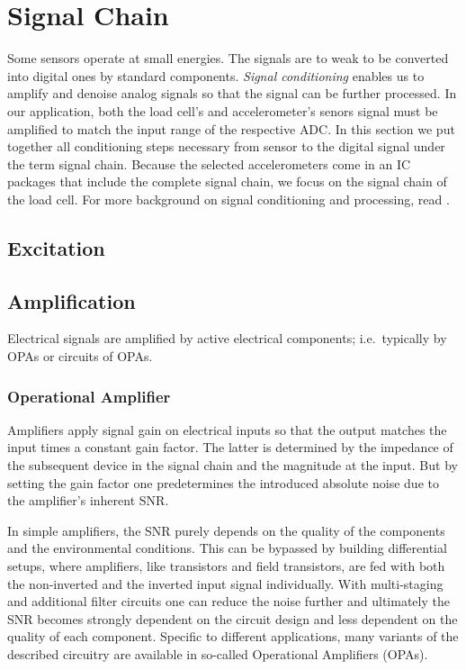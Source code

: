 \chapter{Signal Chain%
  \label{chap:\currfilebase}}

Some sensors operate at small energies. The signals are to weak to be converted into digital ones by standard components. \emph{Signal conditioning} enables us to amplify and denoise analog signals so that the signal can be further processed. In our application, both the load cell's and accelerometer's senors signal must be amplified to match the input range of the respective \ac{ADC}. In this section we put together all conditioning steps necessary from sensor to the digital signal under the term signal chain. Because the selected accelerometers come in an \ac{IC} packages that include the complete signal chain, we focus on the signal chain of the load cell. For more background on signal conditioning and processing, read .

\section{Excitation}

\section{Amplification}
Electrical signals are amplified by active electrical components; i.e.\ typically by \ac{OPA}s or circuits of \ac{OPA}s.

\subsection{Operational Amplifier}

Amplifiers apply signal gain on electrical inputs so that the output matches the input times a constant gain factor. The latter is determined by the impedance of the subsequent device in the signal chain and the magnitude at the input. But by setting the gain factor one predetermines the introduced absolute noise due to the amplifier's inherent \ac{SNR}.

In simple amplifiers, the \ac{SNR} purely depends on the quality of the components and the environmental conditions. This can be bypassed by building differential setups, where amplifiers, like transistors and field transistors, are fed with both the non-inverted and the inverted input signal individually. With multi-staging and additional filter circuits one can reduce the noise further and ultimately the \ac{SNR} becomes strongly dependent on the circuit design and less dependent on the quality of each component. Specific to different applications, many variants of the described circuitry are available in so-called Operational Amplifiers (\acs{OPA}s).

